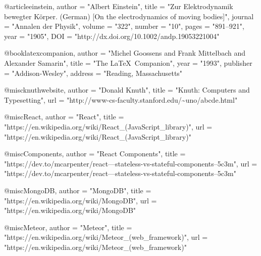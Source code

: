 @article{einstein,
    author =       "Albert Einstein",
    title =        "{Zur Elektrodynamik bewegter K{\"o}rper}. ({German})
        [{On} the electrodynamics of moving bodies]",
    journal =      "Annalen der Physik",
    volume =       "322",
    number =       "10",
    pages =        "891--921",
    year =         "1905",
    DOI =          "http://dx.doi.org/10.1002/andp.19053221004"
}
 
@book{latexcompanion,
    author    = "Michel Goossens and Frank Mittelbach and Alexander Samarin",
    title     = "The \LaTeX\ Companion",
    year      = "1993",
    publisher = "Addison-Wesley",
    address   = "Reading, Massachusetts"
}
 
@misc{knuthwebsite,
    author    = "Donald Knuth",
    title     = "Knuth: Computers and Typesetting",
    url       = "http://www-cs-faculty.stanford.edu/\~{}uno/abcde.html"
}

@misc{React,
	author    = "React",
	title     = "https://en.wikipedia.org/wiki/React_(JavaScript_library)",
	url       = "https://en.wikipedia.org/wiki/React_(JavaScript_library)"
}

@misc{Components,
	author    = "React Components",
	title     = "https://dev.to/mcarpenter/react---stateless-vs-stateful-components--5c3m",
	url       = "https://dev.to/mcarpenter/react---stateless-vs-stateful-components--5c3m"
}

@misc{MongoDB,
	author    = "MongoDB",
	title     = "https://en.wikipedia.org/wiki/MongoDB",
	url       = "https://en.wikipedia.org/wiki/MongoDB"
}

@misc{Meteor,
	author    = "Meteor",
	title     = "https://en.wikipedia.org/wiki/Meteor_(web_framework)",
	url       = "https://en.wikipedia.org/wiki/Meteor_(web_framework)"
}